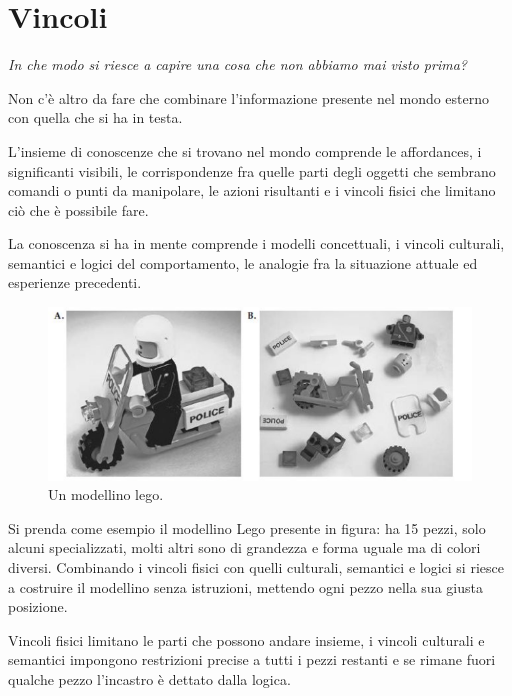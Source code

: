 \chapter{Vincoli}
\begin{flushleft}
	\textit{In che modo si riesce a capire una cosa che non abbiamo mai visto prima?}
\end{flushleft}

Non c'è altro da fare che combinare l'informazione presente nel mondo esterno con quella che si ha in testa.

L'insieme di conoscenze che si trovano nel mondo comprende le affordances, i significanti visibili, le corrispondenze fra quelle parti degli oggetti che sembrano comandi o punti da manipolare, le azioni risultanti e i vincoli fisici che limitano ciò che è possibile fare.

La conoscenza si ha in mente comprende i modelli concettuali, i vincoli culturali, semantici e logici del comportamento, le analogie fra la situazione attuale ed esperienze precedenti.

\begin{figure}[!h]
	\centering
	\includegraphics[scale = 0.7]{"immagini/Modellino Lego"}
	\caption{Un modellino lego.}
\end{figure}

Si prenda come esempio il modellino Lego presente in figura: ha 15 pezzi, solo alcuni specializzati, molti altri sono di grandezza e forma uguale ma di colori diversi. Combinando i vincoli fisici con quelli culturali, semantici e logici si riesce a costruire il modellino senza istruzioni, mettendo ogni pezzo nella sua giusta posizione.

Vincoli fisici limitano le parti che possono andare insieme, i vincoli culturali e semantici impongono restrizioni precise a tutti i pezzi restanti e se rimane fuori qualche pezzo l'incastro è dettato dalla logica.

